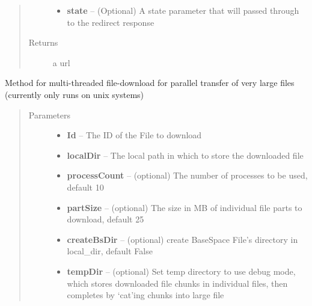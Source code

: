 \documentclass[letterpaper,10pt,english]{sphinxmanual}
\begin{document}
\begin{fulllineitems}
\begin{fulllineitems}
\begin{quote}
\begin{description}
\begin{itemize}
\item {} 
\textbf{state} -- (Optional) A state parameter that will passed through to the redirect response

\end{itemize}

\item[{Returns}] \leavevmode
a url

\end{description}\end{quote}

\end{fulllineitems}


\begin{fulllineitems}
\label{Available modules:BaseSpacePy.api.BaseSpaceAPI.BaseSpaceAPI.multipartFileDownload}
Method for multi-threaded file-download for parallel transfer of very large files (currently only runs on unix systems)
\begin{quote}\begin{description}
\item[{Parameters}] \leavevmode\begin{itemize}
\item {} 
\textbf{Id} -- The ID of the File to download

\item {} 
\textbf{localDir} -- The local path in which to store the downloaded file

\item {} 
\textbf{processCount} -- (optional) The number of processes to be used, default 10

\item {} 
\textbf{partSize} -- (optional) The size in MB of individual file parts to download, default 25

\item {} 
\textbf{createBsDir} -- (optional) create BaseSpace File's directory in local\_dir, default False

\item {} 
\textbf{tempDir} -- (optional) Set temp directory to use debug mode, which stores downloaded file chunks in individual files, then completes by `cat'ing chunks into large file

\end{itemize}


\end{description}
\end{quote}
\end{fulllineitems}
\end{fulllineitems}
\end{document}
